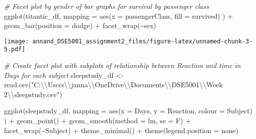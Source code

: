 \documentclass[
]{article}
\newenvironment{Shaded}{\begin{snugshade}}{\end{snugshade}}
\newcommand{\AttributeTok}[1]{\textcolor[rgb]{0.77,0.63,0.00}{#1}}
\newcommand{\CommentTok}[1]{\textcolor[rgb]{0.56,0.35,0.01}{\textit{#1}}}
\newcommand{\FunctionTok}[1]{\textcolor[rgb]{0.00,0.00,0.00}{#1}}
\newcommand{\NormalTok}[1]{#1}
\newcommand{\OtherTok}[1]{\textcolor[rgb]{0.56,0.35,0.01}{#1}}
\newcommand{\SpecialCharTok}[1]{\textcolor[rgb]{0.00,0.00,0.00}{#1}}
\newcommand{\StringTok}[1]{\textcolor[rgb]{0.31,0.60,0.02}{#1}}
\begin{document}
\begin{Shaded}
\begin{Highlighting}[]
\CommentTok{\# Facet plot by gender of bar graphs for survival by passenger class}
\FunctionTok{ggplot}\NormalTok{(titantic\_df,}
       \AttributeTok{mapping =} \FunctionTok{aes}\NormalTok{(}\AttributeTok{x =}\NormalTok{ passengerClass, }\AttributeTok{fill =}\NormalTok{ survived)}
\NormalTok{) }\SpecialCharTok{+} \FunctionTok{geom\_bar}\NormalTok{(}\AttributeTok{position =} \StringTok{\textquotesingle{}dodge\textquotesingle{}}\NormalTok{) }\SpecialCharTok{+}
  \FunctionTok{facet\_wrap}\NormalTok{(}\SpecialCharTok{\textasciitilde{}}\NormalTok{sex)}
\end{Highlighting}
\end{Shaded}

\texttt{[image: annand\_DSE5001\_assignment2\_files/figure-latex/unnamed-chunk-3-5.pdf]}

\begin{Shaded}
\begin{Highlighting}[]
\CommentTok{\# Create facet plot with subplots of relationship between Reaction and time in Days for each subject}
\NormalTok{sleepstudy\_df }\OtherTok{\textless{}{-}} \FunctionTok{read.csv}\NormalTok{(}\StringTok{"C:}\SpecialCharTok{\textbackslash{}\textbackslash{}}\StringTok{Users}\SpecialCharTok{\textbackslash{}\textbackslash{}}\StringTok{janna}\SpecialCharTok{\textbackslash{}\textbackslash{}}\StringTok{OneDrive}\SpecialCharTok{\textbackslash{}\textbackslash{}}\StringTok{Documents}\SpecialCharTok{\textbackslash{}\textbackslash{}}\StringTok{DSE5001}\SpecialCharTok{\textbackslash{}\textbackslash{}}\StringTok{Week 2}\SpecialCharTok{\textbackslash{}\textbackslash{}}\StringTok{sleepstudy.csv"}\NormalTok{)}

\FunctionTok{ggplot}\NormalTok{(sleepstudy\_df,}
       \AttributeTok{mapping =} \FunctionTok{aes}\NormalTok{(}\AttributeTok{x =}\NormalTok{ Days, }\AttributeTok{y =}\NormalTok{ Reaction, }\AttributeTok{colour =}\NormalTok{ Subject)}
\NormalTok{) }\SpecialCharTok{+} \FunctionTok{geom\_point}\NormalTok{() }\SpecialCharTok{+}
  \FunctionTok{geom\_smooth}\NormalTok{(}\AttributeTok{method =} \StringTok{\textquotesingle{}lm\textquotesingle{}}\NormalTok{, }\AttributeTok{se =}\NormalTok{ F) }\SpecialCharTok{+}
  \FunctionTok{facet\_wrap}\NormalTok{(}\SpecialCharTok{\textasciitilde{}}\NormalTok{Subject) }\SpecialCharTok{+}
  \FunctionTok{theme\_minimal}\NormalTok{() }\SpecialCharTok{+}
  \FunctionTok{theme}\NormalTok{(}\AttributeTok{legend.position =} \StringTok{\textquotesingle{}none\textquotesingle{}}\NormalTok{)}
\end{Highlighting}
\end{Shaded}
\end{document}
